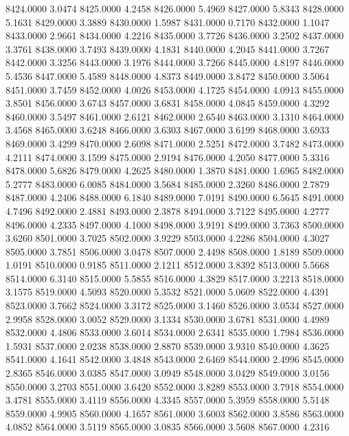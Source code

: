 8424.0000      3.0474
8425.0000      4.2458
8426.0000      5.4969
8427.0000      5.8343
8428.0000      5.1631
8429.0000      3.3889
8430.0000      1.5987
8431.0000      0.7170
8432.0000      1.1047
8433.0000      2.9661
8434.0000      4.2216
8435.0000      3.7726
8436.0000      3.2502
8437.0000      3.3761
8438.0000      3.7493
8439.0000      4.1831
8440.0000      4.2045
8441.0000      3.7267
8442.0000      3.3256
8443.0000      3.1976
8444.0000      3.7266
8445.0000      4.8197
8446.0000      5.4536
8447.0000      5.4589
8448.0000      4.8373
8449.0000      3.8472
8450.0000      3.5064
8451.0000      3.7459
8452.0000      4.0026
8453.0000      4.1725
8454.0000      4.0913
8455.0000      3.8501
8456.0000      3.6743
8457.0000      3.6831
8458.0000      4.0845
8459.0000      4.3292
8460.0000      3.5497
8461.0000      2.6121
8462.0000      2.6540
8463.0000      3.1310
8464.0000      3.4568
8465.0000      3.6248
8466.0000      3.6303
8467.0000      3.6199
8468.0000      3.6933
8469.0000      3.4299
8470.0000      2.6098
8471.0000      2.5251
8472.0000      3.7482
8473.0000      4.2111
8474.0000      3.1599
8475.0000      2.9194
8476.0000      4.2050
8477.0000      5.3316
8478.0000      5.6826
8479.0000      4.2625
8480.0000      1.3870
8481.0000      1.6965
8482.0000      5.2777
8483.0000      6.0085
8484.0000      3.5684
8485.0000      2.3260
8486.0000      2.7879
8487.0000      4.2406
8488.0000      6.1840
8489.0000      7.0191
8490.0000      6.5645
8491.0000      4.7496
8492.0000      2.4881
8493.0000      2.3878
8494.0000      3.7122
8495.0000      4.2777
8496.0000      4.2335
8497.0000      4.1000
8498.0000      3.9191
8499.0000      3.7363
8500.0000      3.6260
8501.0000      3.7025
8502.0000      3.9229
8503.0000      4.2286
8504.0000      4.3027
8505.0000      3.7851
8506.0000      3.0478
8507.0000      2.4498
8508.0000      1.8189
8509.0000      1.0191
8510.0000      0.9185
8511.0000      2.1211
8512.0000      3.8392
8513.0000      5.5668
8514.0000      6.3140
8515.0000      5.5855
8516.0000      4.3829
8517.0000      3.2213
8518.0000      3.1575
8519.0000      4.5093
8520.0000      5.3532
8521.0000      5.0609
8522.0000      4.4391
8523.0000      3.7662
8524.0000      3.3172
8525.0000      3.1460
8526.0000      3.0534
8527.0000      2.9958
8528.0000      3.0052
8529.0000      3.1334
8530.0000      3.6781
8531.0000      4.4989
8532.0000      4.4806
8533.0000      3.6014
8534.0000      2.6341
8535.0000      1.7984
8536.0000      1.5931
8537.0000      2.0238
8538.0000      2.8870
8539.0000      3.9310
8540.0000      4.3625
8541.0000      4.1641
8542.0000      3.4848
8543.0000      2.6469
8544.0000      2.4996
8545.0000      2.8365
8546.0000      3.0385
8547.0000      3.0949
8548.0000      3.0429
8549.0000      3.0156
8550.0000      3.2703
8551.0000      3.6420
8552.0000      3.8289
8553.0000      3.7918
8554.0000      3.4781
8555.0000      3.4119
8556.0000      4.3345
8557.0000      5.3959
8558.0000      5.5148
8559.0000      4.9905
8560.0000      4.1657
8561.0000      3.6003
8562.0000      3.8586
8563.0000      4.0852
8564.0000      3.5119
8565.0000      3.0835
8566.0000      3.5608
8567.0000      4.2316
